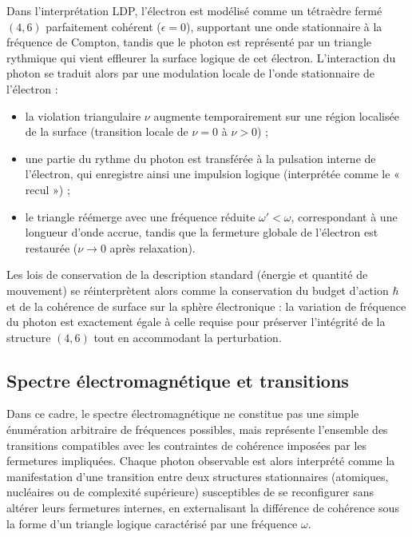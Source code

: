 \documentclass[11pt,a4paper]{article}
\begin{document}
Dans l’interprétation LDP, l’électron est modélisé comme un tétraèdre fermé \(\left(4,6\right)\) parfaitement cohérent (\(\epsilon = 0\)), supportant une onde stationnaire à la fréquence de Compton, tandis que le photon est représenté par un triangle rythmique qui vient effleurer la surface logique de cet électron. L’interaction du photon se traduit alors par une modulation locale de l’onde stationnaire de l’électron :
\begin{itemize}
  \item la violation triangulaire \(\nu\) augmente temporairement sur une région localisée de la surface (transition locale de \(\nu = 0\) à \(\nu > 0\)) ;
  \item une partie du rythme du photon est transférée à la pulsation interne de l’électron, qui enregistre ainsi une impulsion logique (interprétée comme le « recul ») ;
  \item le triangle réémerge avec une fréquence réduite \(\omega' < \omega\), correspondant à une longueur d’onde accrue, tandis que la fermeture globale de l’électron est restaurée (\(\nu \rightarrow 0\) après relaxation).
\end{itemize}

Les lois de conservation de la description standard (énergie et quantité de mouvement) se réinterprètent alors comme la conservation du budget d’action \(\hbar\) et de la cohérence de surface sur la sphère électronique : la variation de fréquence du photon est exactement égale à celle requise pour préserver l’intégrité de la structure \(\left(4,6\right)\) tout en accommodant la perturbation.

\subsection{Spectre électromagnétique et transitions}

Dans ce cadre, le spectre électromagnétique ne constitue pas une simple énumération arbitraire de fréquences possibles, mais représente l’ensemble des transitions compatibles avec les contraintes de cohérence imposées par les fermetures impliquées. Chaque photon observable est alors interprété comme la manifestation d’une transition entre deux structures stationnaires (atomiques, nucléaires ou de complexité supérieure) susceptibles de se reconfigurer sans altérer leurs fermetures internes, en externalisant la différence de cohérence sous la forme d’un triangle logique caractérisé par une fréquence \(\omega\). 
\end{document}
